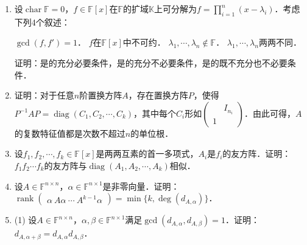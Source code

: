 \documentclass[a4paper,fontset=windows]{ctexbook}
\theoremstyle{definition}
\DeclareMathOperator{\Char}{char}
\DeclareMathOperator{\diag}{diag}
\DeclareMathOperator{\rank}{rank}
\begin{document}
\begin{enumerate}
(9) $\begin{pmatrix}a_1+b_1&a_1+b_2&\cdots&a_1+b_n \\ a_2+b_1&a_2+b_2&\cdots&a_2+b_n \\ \vdots&\vdots&\ddots&\vdots \\ a_n+b_1&a_n+b_2&\cdots&a_n+b_n\end{pmatrix}$ \hspace{13pt}
(10) $\begin{pmatrix}1+a_1b_1&a_1b_2&\cdots&a_1b_n \\ a_2b_1&1+a_2b_2&\cdots&a_2b_n \\ \vdots&\vdots&\ddots&\vdots \\ a_nb_1&a_nb_2&\cdots&1+a_nb_n\end{pmatrix}$

\item 设$\Char\mathbb{F}=0$，$f\in\mathbb{F}[x]$在$\mathbb{F}$的扩域$\mathbb{K}$上可分解为$f=\prod\limits_{i=1}^n(x-\lambda_i)$．考虑下列4个叙述：

 $\gcd(f,f')=1$．
 $f$在$\mathbb{F}[x]$中不可约．
 $\lambda_1,\cdots,\lambda_n\notin\mathbb{F}$．
 $\lambda_1,\cdots,\lambda_n$两两不同．

证明：是的充分必要条件，是的充分不必要条件，是的既不充分也不必要条件．

\item 证明：对于任意$n$阶置换方阵$A$，存在置换方阵$P$，使得$P^{-1}AP=\diag(C_1,C_2,\cdots,C_k)$，其中每个$C_i$形如$\begin{pmatrix}&I_{n_i} \\ 1&\end{pmatrix}$．由此可得，$A$的复数特征值都是次数不超过$n$的单位根．

\item 设$f_1,f_2,\cdots,f_k\in\mathbb{F}[x]$是两两互素的首一多项式，$A_i$是$f_i$的友方阵．证明：$f_1f_2\cdots f_k$的友方阵与$\diag(A_1,A_2,\cdots,A_k)$相似．

\item 设$A\in\mathbb{F}^{n\times n}$，$\alpha\in\mathbb{F}^{n\times 1}$是非零向量．证明：$\rank\begin{pmatrix}\alpha~A\alpha~\cdots~A^{k-1}\alpha\end{pmatrix}=\min\{k,\deg(d_{A,\alpha})\}$．

\item (1) 设$A\in\mathbb{F}^{n\times n}$，$\alpha,\beta\in\mathbb{F}^{n\times 1}$满足$\gcd(d_{A,\alpha},d_{A,\beta})=1$．证明：$d_{A,\alpha+\beta}=d_{A,\alpha}d_{A,\beta}$．


\end{enumerate}
\end{document}
